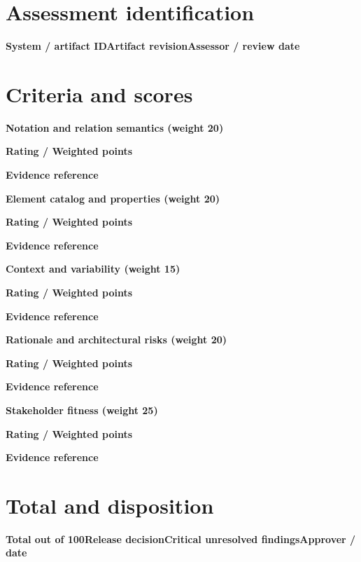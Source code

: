 \documentclass[10pt,letterpaper]{article}
\begin{document}
\DocProvenance
\section{Assessment identification}
\textbf{System / artifact ID}\textbf{Artifact revision}\textbf{Assessor / review date}
\section{Criteria and scores}
\textbf{Notation and relation semantics (weight 20)}\par\textbf{Rating / Weighted points}\par{}\textbf{Evidence reference}\par{}
\textbf{Element catalog and properties (weight 20)}\par\textbf{Rating / Weighted points}\par{}\textbf{Evidence reference}\par{}
\textbf{Context and variability (weight 15)}\par\textbf{Rating / Weighted points}\par{}\textbf{Evidence reference}\par{}
\textbf{Rationale and architectural risks (weight 20)}\par\textbf{Rating / Weighted points}\par{}\textbf{Evidence reference}\par{}
\textbf{Stakeholder fitness (weight 25)}\par\textbf{Rating / Weighted points}\par{}\textbf{Evidence reference}\par{}
\section{Total and disposition}
\textbf{Total out of 100}\textbf{Release decision}\textbf{Critical unresolved findings}\textbf{Approver / date}
\end{document}
